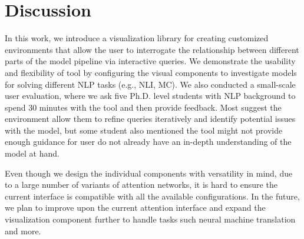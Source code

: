 \section{Discussion}
In this work, we introduce a visualization library for creating customized environments that allow the user to interrogate the relationship between different parts of the model pipeline via interactive queries.
%
We demonstrate the usability and flexibility of tool by configuring the visual components to investigate models for solving different NLP tasks (e.g., NLI, MC).
%
We also conducted a small-scale user evaluation, where we ask five Ph.D. level students with NLP background to spend 30 minutes with the tool and then provide feedback. Most suggest the environment allow them to refine queries iteratively and identify potential issues with the model, but some student also mentioned the tool might not provide enough guidance for user do not already have an in-depth understanding of the model at hand.

Even though we design the individual components with versatility in mind, due to a large number of variants of attention networks, it is hard to ensure the current interface is compatible with all the available configurations.
%
In the future, we plan to improve upon the current attention interface and expand the visualization component further to handle tasks such neural machine translation and more. 
